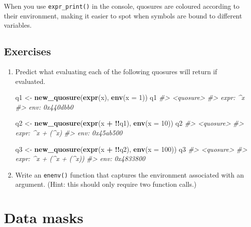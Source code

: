 \documentclass[]{book}
\newenvironment{Shaded}{\begin{snugshade}}{\end{snugshade}}
\newcommand{\CommentTok}[1]{\textcolor[rgb]{0.37,0.37,0.37}{\textit{#1}}}
\newcommand{\DataTypeTok}[1]{\textcolor[rgb]{0.27,0.27,0.27}{#1}}
\newcommand{\DecValTok}[1]{\textcolor[rgb]{0.06,0.06,0.06}{#1}}
\newcommand{\KeywordTok}[1]{\textcolor[rgb]{0.27,0.27,0.27}{\textbf{#1}}}
\newcommand{\NormalTok}[1]{#1}
\newcommand{\OperatorTok}[1]{\textcolor[rgb]{0.43,0.43,0.43}{\textbf{#1}}}
\newcommand{\StringTok}[1]{\textcolor[rgb]{0.5,0.5,0.5}{#1}}
\begin{document}
When you use \texttt{expr\_print()} in the console, quosures are coloured according to their environment, making it easier to spot when symbols are bound to different variables.

\hypertarget{exercises-10}{%
\subsection{Exercises}\label{exercises-10}}

\begin{enumerate}
\def\labelenumi{\arabic{enumi}.}
\item
  Predict what evaluating each of the following quosures will return if
  evaluated.

\begin{Shaded}
\begin{Highlighting}[]
\NormalTok{q1 <-}\StringTok{ }\KeywordTok{new_quosure}\NormalTok{(}\KeywordTok{expr}\NormalTok{(x), }\KeywordTok{env}\NormalTok{(}\DataTypeTok{x =} \DecValTok{1}\NormalTok{))}
\NormalTok{q1}
\CommentTok{#> <quosure>}
\CommentTok{#> expr: ^x}
\CommentTok{#> env:  0x440dbb0}

\NormalTok{q2 <-}\StringTok{ }\KeywordTok{new_quosure}\NormalTok{(}\KeywordTok{expr}\NormalTok{(x }\OperatorTok{+}\StringTok{ }\OperatorTok{!!}\NormalTok{q1), }\KeywordTok{env}\NormalTok{(}\DataTypeTok{x =} \DecValTok{10}\NormalTok{))}
\NormalTok{q2}
\CommentTok{#> <quosure>}
\CommentTok{#> expr: ^x + (^x)}
\CommentTok{#> env:  0x45ab500}

\NormalTok{q3 <-}\StringTok{ }\KeywordTok{new_quosure}\NormalTok{(}\KeywordTok{expr}\NormalTok{(x }\OperatorTok{+}\StringTok{ }\OperatorTok{!!}\NormalTok{q2), }\KeywordTok{env}\NormalTok{(}\DataTypeTok{x =} \DecValTok{100}\NormalTok{))}
\NormalTok{q3}
\CommentTok{#> <quosure>}
\CommentTok{#> expr: ^x + (^x + (^x))}
\CommentTok{#> env:  0x4833800}
\end{Highlighting}
\end{Shaded}
\item
  Write an \texttt{enenv()} function that captures the environment associated
  with an argument. (Hint: this should only require two function calls.)
\end{enumerate}

\hypertarget{data-masks}{%
\section{Data masks}\label{data-masks}}

\end{document}
